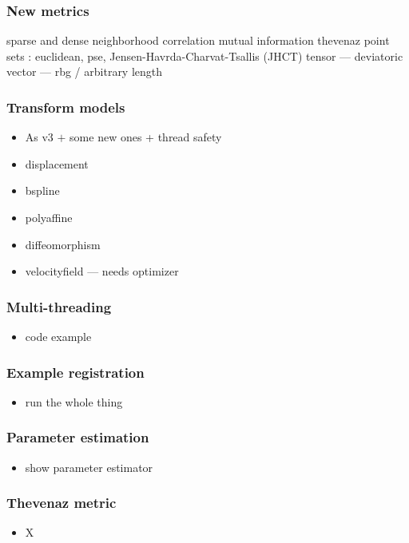 \begin{frame}
\frametitle{New metrics }
\Large
\begin{itemize}
 sparse and dense neighborhood correlation
mutual information thevenaz
point sets :  euclidean, pse, Jensen-Havrda-Charvat-Tsallis (JHCT)
tensor --- deviatoric 
vector --- rbg / arbitrary length
\end{itemize}
\end{frame}

\begin{frame}
\frametitle{Transform models}
\Large
\begin{itemize}
\item As v3 $+$ some new ones + thread safety 
\item displacement
\item bspline
\item polyaffine
\item diffeomorphism
\item velocityfield --- needs optimizer
\end{itemize}
\end{frame}

\begin{frame}
\frametitle{Multi-threading}
\Large
\begin{itemize}
\item code example
\end{itemize}
\end{frame}

\begin{frame}
\frametitle{Example registration}
\Large
\begin{itemize}
\item run the whole thing
\end{itemize}
\end{frame}

\begin{frame}
\frametitle{Parameter estimation }
\Large
\begin{itemize}
\item show parameter estimator 
\end{itemize}
\end{frame}

\begin{frame}
\frametitle{Thevenaz metric}
\Large
\begin{itemize}
\item X
\end{itemize}
\end{frame}

